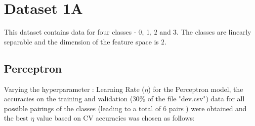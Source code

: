 \documentclass[11pt,a4paper]{article}
\begin{document}
{\hypersetup{linkcolor=black}
 \tableofcontents}
\break


\section{Dataset 1A}
This dataset contains data for four classes - 0, 1, 2 and 3. The classes are linearly separable and the dimension of the feature space is 2.
\subsection{Perceptron}
Varying the hyperparameter : Learning Rate ($\eta$) for the Perceptron model, the accuracies on the training and validation (30\% of the file "dev.csv") data for all possible pairings of the classes (leading to a total of 6 pairs ) were obtained and the best $\eta$ value based on CV accuracies was chosen as follows:
\end{document}
